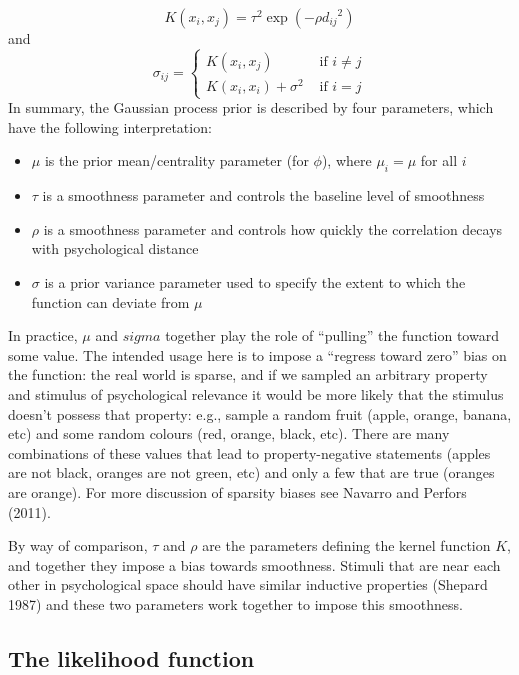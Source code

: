 \documentclass[
  english,
  doc]{apa6}
\providecommand{\tightlist}{%
  \setlength{\itemsep}{0pt}\setlength{\parskip}{0pt}}
\begin{document}
\[
K(x_i, x_j) = \tau^2 \exp\left(-\rho {d_{ij}}^2\right)
\]
and
\[
\sigma_{ij} = \left\{ \begin{array}{rl} K(x_i, x_j) & \mbox{ if } i \neq j \\ K(x_i, x_i) + \sigma^2 & \mbox{ if } i = j \end{array}  \right.
\]
\noindent
In summary, the Gaussian process prior is described by four parameters, which have the following interpretation:

\begin{itemize}
\tightlist
\item
  \(\mu\) is the prior mean/centrality parameter (for \(\phi\)), where \(\mu_i = \mu\) for all \(i\)
\item
  \(\tau\) is a smoothness parameter and controls the baseline level of smoothness
\item
  \(\rho\) is a smoothness parameter and controls how quickly the correlation decays with psychological distance
\item
  \(\sigma\) is a prior variance parameter used to specify the extent to which the function can deviate from \(\mu\)
\end{itemize}

\noindent
In practice, \(\mu\) and \(sigma\) together play the role of \enquote{pulling} the function toward some value. The intended usage here is to impose a \enquote{regress toward zero} bias on the function: the real world is sparse, and if we sampled an arbitrary property and stimulus of psychological relevance it would be more likely that the stimulus doesn't possess that property: e.g., sample a random fruit (apple, orange, banana, etc) and some random colours (red, orange, black, etc). There are many combinations of these values that lead to property-negative statements (apples are not black, oranges are not green, etc) and only a few that are true (oranges are orange). For more discussion of sparsity biases see Navarro and Perfors (2011).

By way of comparison, \(\tau\) and \(\rho\) are the parameters defining the kernel function \(K\), and together they impose a bias towards smoothness. Stimuli that are near each other in psychological space should have similar inductive properties (Shepard 1987) and these two parameters work together to impose this smoothness.

\hypertarget{the-likelihood-function}{%
\subsection{The likelihood function}\label{the-likelihood-function}}
\end{document}
